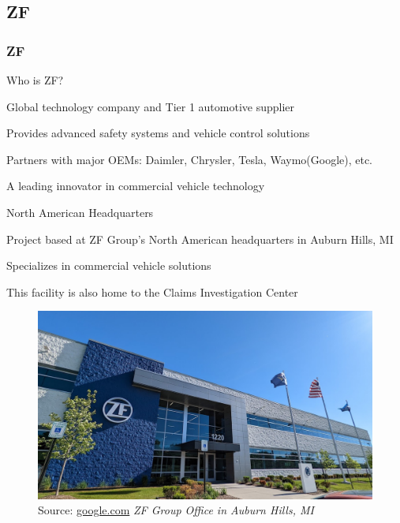 \documentclass[8pt,compress,aspectratio=169]{beamer}
\begin{document}
\subsection{ZF}
\begin{frame}
  \frametitle{ZF}
  \begin{minipage}{0.45\textwidth}
    \begin{block}{Who is ZF?}
      \begin{itemize}
          \small {
            \item Global technology company and Tier 1 automotive supplier
            \item Provides advanced safety systems and vehicle control solutions
            \item Partners with major OEMs: Daimler, Chrysler, Tesla, Waymo(Google), etc.
            \item A leading innovator in commercial vehicle technology
          }
      \end{itemize}
    \end{block}
    \begin{block}{North American Headquarters}
      \begin{itemize}
          \small {
            \item Project based at ZF Group's North American headquarters in Auburn Hills, MI
            \item Specializes in commercial vehicle solutions
            \item This facility is also home to the Claims Investigation Center
            }
      \end{itemize}
    \end{block}
  \end{minipage}
  \hfill
  \begin{minipage}{0.45\textwidth}
    \begin{figure}
      \includegraphics[width=\textwidth]{assets/misc/zf-office.jpg}
      \caption{Source: \href{google.com}{google.com}\hspace{\textwidth}
      \textit{ZF Group Office in Auburn Hills, MI}}
    \end{figure}
  \end{minipage}
\end{frame}
\end{document}
